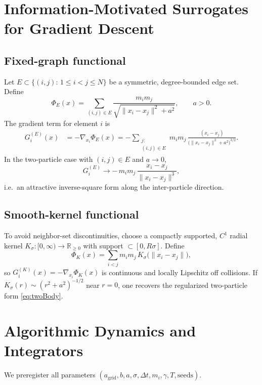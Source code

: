 \documentclass[11pt,a4paper]{article}
\numberwithin{equation}{section}
\newcommand{\R}{\mathbb{R}}
\begin{document}
\section{Information-Motivated Surrogates for Gradient Descent}

\subsection{Fixed-graph functional}
Let $E\subset\{(i,j):\,1\le i<j\le N\}$ be a symmetric, degree-bounded edge set. Define
\begin{equation}
\label{eq:phiE}
\Phi_E(x)= \sum_{(i,j)\in E} \frac{m_im_j}{\sqrt{\lVert x_i-x_j\rVert^2+a^2}},\qquad a>0.
\end{equation}
The gradient term for element $i$ is
\begin{align}
\label{eq:forceE}
G^{(E)}_i(x)
&= -\nabla_{x_i}\Phi_E(x)
= -\sum_{\substack{j:\\(i,j)\in E}}
m_im_j\,\frac{(x_i-x_j)}{\big(\lVert x_i-x_j\rVert^2+a^2\big)^{3/2}}.
\end{align}
In the two-particle case with $(i,j)\in E$ and $a\to 0$,
\begin{equation}
\label{eq:twoBody}
G^{(E)}_i \to -\,m_im_j\,\frac{x_i-x_j}{\lVert x_i-x_j\rVert^3},
\end{equation}
i.e.\ an attractive inverse-square form along the inter-particle direction.

\subsection{Smooth-kernel functional}
To avoid neighbor-set discontinuities, choose a compactly supported, $C^1$ radial kernel $K_\sigma:[0,\infty)\to\R_{\ge 0}$ with support $\subset[0,R\sigma]$. Define
\begin{equation}
\label{eq:phiK}
\Phi_K(x)= \sum_{i<j} m_im_j\,K_\sigma\!\big(\lVert x_i-x_j\rVert\big),
\end{equation}
so $G^{(K)}_i(x)=-\nabla_{x_i}\Phi_K(x)$ is continuous and locally Lipschitz off collisions. If $K_\sigma(r)\sim (r^2+a^2)^{-1/2}$ near $r=0$, one recovers the regularized two-particle form \eqref{eq:twoBody}.

\section{Algorithmic Dynamics and Integrators}
We preregister all parameters $(a_{\text{grid}},b,a,\sigma,\Delta t,m_i,\gamma,T,\text{seeds})$.
\end{document}
